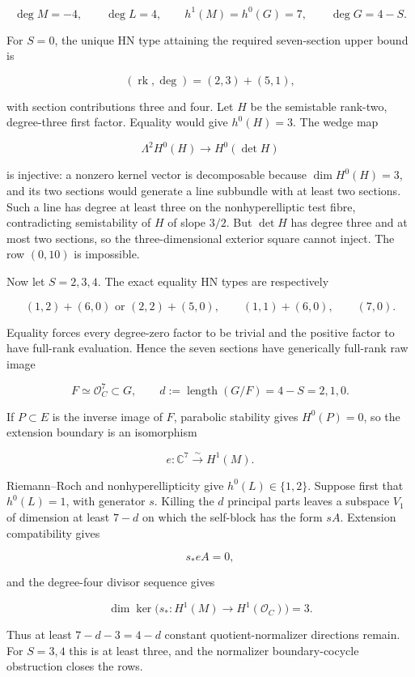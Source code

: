 \documentclass[11pt]{article}
\theoremstyle{definition}
\begin{document}
\[\deg M=-4,\qquad \deg L=4,\qquad h^1(M)=h^0(G)=7,
\qquad \deg G=4-S.\]

For \(S=0\), the unique HN type attaining the required seven-section
upper bound is

\[(\operatorname{rk},\deg)=(2,3)+(5,1),\]

with section contributions three and four. Let \(H\) be the semistable
rank-two, degree-three first factor. Equality would give \(h^0(H)=3\).
The wedge map

\[\Lambda^2H^0(H)\longrightarrow H^0(\det H)\]

is injective: a nonzero kernel vector is decomposable because
\(\dim H^0(H)=3\), and its two sections would generate a line subbundle
with at least two sections. Such a line has degree at least three on the
nonhyperelliptic test fibre, contradicting semistability of \(H\) of
slope \(3/2\). But \(\det H\) has degree three and at most two sections,
so the three-dimensional exterior square cannot inject. The row
\((0,10)\) is impossible.

Now let \(S=2,3,4\). The exact equality HN types are respectively

\[(1,2)+(6,0)\text{ or }(2,2)+(5,0),
\qquad (1,1)+(6,0),
\qquad (7,0).\]

Equality forces every degree-zero factor to be trivial and the positive
factor to have full-rank evaluation. Hence the seven sections have
generically full-rank raw image

\[F\simeq\mathcal O_C^7\subset G,
\qquad d:=\operatorname{length}(G/F)=4-S=2,1,0.\]

If \(P\subset E\) is the inverse image of \(F\), parabolic stability
gives \(H^0(P)=0\), so the extension boundary is an isomorphism

\[e:\mathbb C^7\overset\sim\longrightarrow H^1(M).\]

Riemann--Roch and nonhyperellipticity give \(h^0(L)\in\{1,2\}\).
Suppose first that \(h^0(L)=1\), with generator \(s\). Killing the \(d\)
principal parts leaves a subspace \(V_1\) of dimension at least \(7-d\)
on which the self-block has the form \(sA\). Extension compatibility
gives

\[s_*eA=0,\]

and the degree-four divisor sequence gives

\[\dim\ker\bigl(s_*:H^1(M)\longrightarrow H^1(\mathcal O_C)\bigr)=3.\]

Thus at least \(7-d-3=4-d\) constant quotient-normalizer directions
remain. For \(S=3,4\) this is at least three, and the normalizer
boundary-cocycle obstruction closes the rows.
\end{document}
